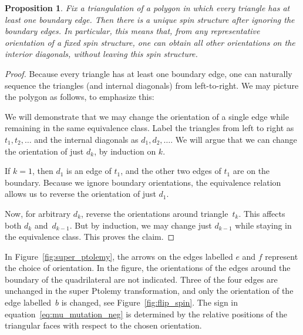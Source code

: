\documentclass[pdftex]{sigma}
\numberwithin{equation}{section}
\newtheorem{Proposition}[Theorem]{Proposition}
 {\theoremstyle{Definition}
\newtheorem{Definition}[Theorem]{Definition}
\newtheorem{Example}[Theorem]{Example}
\newtheorem{Remark}[Theorem]{Remark}
\newtheorem{Question}[Theorem]{Question} }
\begin{document}
\begin {Proposition} \label{prop:equiv_rel}
 Fix a triangulation of a polygon in which every triangle has at least one boundary edge. Then there is a unique spin structure after ignoring the boundary edges. In particular, this means that, from any representative orientation of a fixed spin structure, one can obtain all other orientations on the interior diagonals, without leaving this spin structure.
\end {Proposition}
\begin {proof}
 Because every triangle has at least one boundary edge, one can naturally sequence the triangles (and internal diagonals) from left-to-right.
 We may picture the polygon as follows, to emphasize this:
 \begin{center}
 \end{center}
 We will demonstrate that we may change the orientation of a single edge while remaining in the same equivalence class. Label
 the triangles from left to right as $t_1,t_2,\dots$ and the internal diagonals as $d_1,d_2,\dots$. We will argue that we can change
 the orientation of just $d_k$, by induction on $k$.

 If $k=1$, then $d_1$ is an edge of $t_1$, and the other two edges of $t_1$ are on the boundary. Because we ignore boundary orientations,
 the equivalence relation allows us to reverse the orientation of just $d_1$.

 Now, for arbitrary $d_k$, reverse the orientations around triangle~$t_k$. This affects both $d_k$ and~$d_{k-1}$. But by induction, we may
 change just $d_{k-1}$ while staying in the equivalence class. This proves the claim.
\end {proof}

In Figure~\ref{fig:super_ptolemy}, the arrows on the edges labelled $e$ and $f$ represent the choice of orientation. In the figure,
the orientations of the edges around the boundary of the quadrilateral are not indicated. Three of the four edges are unchanged
in the super Ptolemy transformation, and only the orientation of the edge labelled~$b$ is changed, see Figure~\ref{fig:flip_spin}. The sign in equation~\eqref{eq:mu_mutation_neg} is determined by the relative positions of the triangular faces with respect to the chosen orientation.
\end{document}
